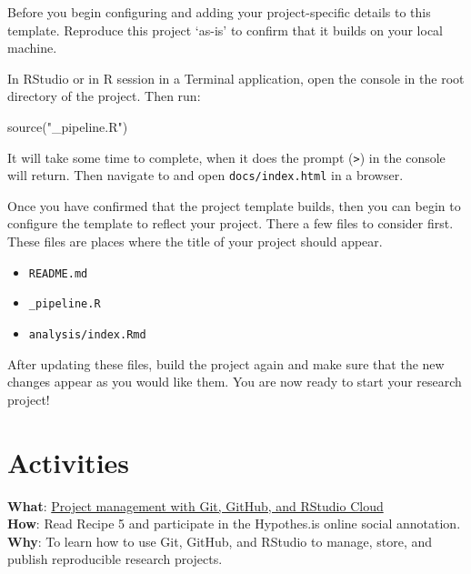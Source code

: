 \documentclass[
  letterpaper,
]{latex/krantz}
\newenvironment{Shaded}{\begin{snugshade}}{\end{snugshade}}
\newcommand{\FunctionTok}[1]{\textcolor[rgb]{0.28,0.35,0.67}{#1}}
\newcommand{\NormalTok}[1]{\textcolor[rgb]{0.00,0.23,0.31}{#1}}
\newcommand{\StringTok}[1]{\textcolor[rgb]{0.13,0.47,0.30}{#1}}
\providecommand{\tightlist}{%
  \setlength{\itemsep}{0pt}\setlength{\parskip}{0pt}}\usepackage{longtable,booktabs,array}
\begin{document}
Before you begin configuring and adding your project-specific details to
this template. Reproduce this project `as-is' to confirm that it builds
on your local machine.

In RStudio or in R session in a Terminal application, open the console
in the root directory of the project. Then run:

\begin{Shaded}
\begin{Highlighting}[]
\FunctionTok{source}\NormalTok{(}\StringTok{"\_pipeline.R"}\NormalTok{)}
\end{Highlighting}
\end{Shaded}

It will take some time to complete, when it does the prompt
(\texttt{\textgreater{}}) in the console will return. Then navigate to
and open \texttt{docs/index.html} in a browser.

Once you have confirmed that the project template builds, then you can
begin to configure the template to reflect your project. There a few
files to consider first. These files are places where the title of your
project should appear.

\begin{itemize}
\tightlist
\item
  \texttt{README.md}
\item
  \texttt{\_pipeline.R}
\item
  \texttt{analysis/index.Rmd}
\end{itemize}

After updating these files, build the project again and make sure that
the new changes appear as you would like them. You are now ready to
start your research project!

\hypertarget{activities-3}{%
\section*{Activities}\label{activities-3}}

\begin{tcolorbox}[enhanced jigsaw, opacitybacktitle=0.6, breakable, colframe=quarto-callout-tip-color-frame, arc=.35mm, left=2mm, leftrule=.75mm, title=\textcolor{quarto-callout-tip-color}{\faLightbulb}\hspace{0.5em}{Recipe}, opacityback=0, colback=white, toptitle=1mm, rightrule=.15mm, titlerule=0mm, bottomtitle=1mm, bottomrule=.15mm, coltitle=black, colbacktitle=quarto-callout-tip-color!10!white, toprule=.15mm]
\textbf{What}:
\href{https://lin380.github.io/tadr/articles/recipe_5.html}{Project
management with Git, GitHub, and RStudio Cloud}\\
\textbf{How}: Read Recipe 5 and participate in the Hypothes.is online
social annotation.\\
\textbf{Why}: To learn how to use Git, GitHub, and RStudio to manage,
store, and publish reproducible research projects.
\end{tcolorbox}
\end{document}
